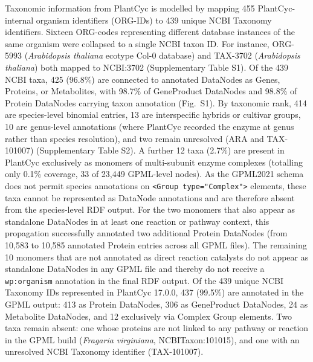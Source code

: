 \documentclass[11pt,a4paper]{article}
\begin{document}
Taxonomic information from PlantCyc is modelled by mapping 455 PlantCyc-internal organism identifiers
(ORG-IDs) to 439 unique NCBI Taxonomy identifiers. Sixteen ORG-codes representing different database
instances of the same organism were collapsed to a single NCBI taxon ID. For instance, ORG-5993
(\textit{Arabidopsis thaliana} ecotype Col-0 database) and TAX-3702 (\textit{Arabidopsis thaliana})
both mapped to NCBI:3702 (Supplementary Table S1). Of the 439 NCBI taxa, 425 (96.8\%) are connected
to annotated DataNodes as Genes, Proteins, or Metabolites, with 98.7\% of GeneProduct DataNodes and
98.8\% of Protein DataNodes carrying taxon annotation (Fig.~S1). By taxonomic rank, 414 are
species-level binomial entries, 13 are interspecific hybrids or cultivar groups, 10 are genus-level
annotations (where PlantCyc recorded the enzyme at genus rather than species resolution), and two
remain unresolved (ARA and TAX-101007) (Supplementary Table S2). A further 12 taxa (2.7\%) are
present in PlantCyc exclusively as monomers of multi-subunit enzyme complexes (totalling only 0.1\%
coverage, 33 of 23,449 GPML-level nodes). As the GPML2021 schema does not permit species annotations
on \texttt{<Group type="Complex">} elements, these taxa cannot be represented as DataNode annotations
and are therefore absent from the species-level RDF output. For the two monomers that also appear as
standalone DataNodes in at least one reaction or pathway context, this propagation successfully
annotated two additional Protein DataNodes (from 10,583 to 10,585 annotated Protein entries across
all GPML files). The remaining 10 monomers that are not annotated as direct reaction catalysts do not
appear as standalone DataNodes in any GPML file and thereby do not receive a \texttt{wp:organism}
annotation in the final RDF output. Of the 439 unique NCBI Taxonomy IDs represented in PlantCyc
17.0.0, 437 (99.5\%) are annotated in the GPML output: 413 as Protein DataNodes, 306 as GeneProduct
DataNodes, 24 as Metabolite DataNodes, and 12 exclusively via Complex Group elements. Two taxa remain
absent: one whose proteins are not linked to any pathway or reaction in the GPML build
(\textit{Fragaria virginiana}, NCBITaxon:101015), and one with an unresolved NCBI Taxonomy identifier
(TAX-101007).
\end{document}
